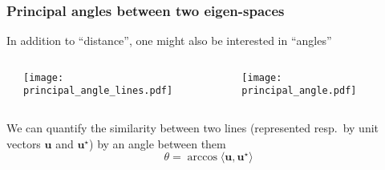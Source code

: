 \documentclass[compress,
mathserif,wide,%
]{beamer}
\begin{document}
\begin{frame}
\frametitle{Principal angles between two eigen-spaces}

\smallskip

In addition to ``distance'', one might also be interested in ``angles''


\begin{columns}
	\begin{column}{0.2\textwidth}
	\end{column}
	
	\begin{column}{0.3\textwidth}
		\begin{center}
			\texttt{[image: principal\_angle\_lines.pdf]}
		\end{center}
	\end{column}

	\begin{column}{0.1\textwidth}
	\end{column}


	\begin{column}{0.3\textwidth}
		\begin{center}
			\texttt{[image: principal\_angle.pdf]}
		\end{center}
	\end{column}

	\begin{column}{0.2\textwidth}
	\end{column}

\end{columns}


\bigskip

\vfill



We can quantify the similarity between two lines (represented resp.~by unit vectors $\bm{u}$ and $\bm{u}^\star$) by an angle between them  
%
\[
	\theta = \arccos \langle \bm{u}, \bm{u}^\star \rangle
\]


\end{frame}
\end{document}
